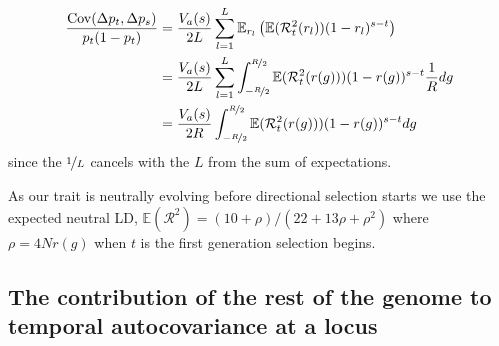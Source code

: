 \documentclass[11pt]{article}
\newcommand{\E}{\mathbb{E}}
\DeclareMathOperator{\cov}{Cov}
\begin{document}
\begin{subequations}
  \begin{align}
    \frac{\cov(\Delta p_t, \Delta p_s)}{p_t(1-p_t) } &= \frac{V_a(s)}{2L} \sum_{l=1}^L \E_{r_l} \left( \E(\mathcal{R}_{t}^2(r_l)) (1-r_l)^{s-t} \right) \label{eq:cont-approx-step-1} \\
                                                     &= \frac{V_a(s)}{2L} \sum_{l=1}^L \int_{-\nicefrac{R}{2}}^{\nicefrac{R}{2}} \E(\mathcal{R}^2_{t}(r(g))) (1-r(g))^{s-t} \frac{1}{R} d g \label{eq:exp-overselpos} \\
                                                     &= \frac{V_a(s)}{2R} \int_{-\nicefrac{R}{2}}^{\nicefrac{R}{2}} \E(\mathcal{R}^2_{t}(r(g))) (1-r(g))^{s-t} d g \label{eq:integral-overselpos}
  \end{align}
\end{subequations}
%
since the $\nicefrac{1}{L}$ cancels with the $L$ from the sum of expectations.

As our trait is neutrally evolving before directional selection starts we use
the expected neutral LD, $\E(\mathcal{R}^2) = (10 + \rho)/(22 + 13 \rho +
\rho^2)$ where $\rho = 4Nr(g)$ \parencite{Ohta1969-ae,Hill1968-ue} when $t$ is
the first generation selection begins. 

\subsection{The contribution of the rest of the genome to temporal autocovariance at a locus}
\label{ap:unlinked-contribution}
\end{document}
